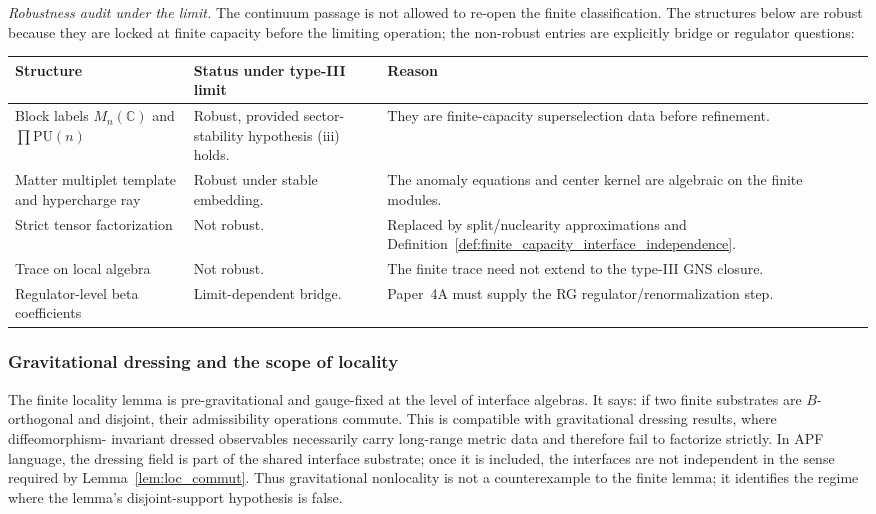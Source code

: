 \documentclass[11pt]{article}
\theoremstyle{definition}
\begin{document}
\noindent\textit{Robustness audit under the limit.}\quad
The continuum passage is not allowed to re-open the finite classification.
The structures below are robust because they are locked at finite capacity
before the limiting operation; the non-robust entries are explicitly bridge
or regulator questions:
\begin{center}
\scriptsize
\renewcommand{\arraystretch}{1.08}
\begin{tabular}{@{}p{3.3cm}p{5.0cm}p{4.0cm}@{}}
\toprule
\textbf{Structure} & \textbf{Status under type-III limit} & \textbf{Reason} \\
\midrule
Block labels $M_n(\mathbb C)$ and $\prod\mathrm{PU}(n)$ & Robust, provided sector-stability hypothesis (iii) holds. & They are finite-capacity superselection data before refinement. \\
Matter multiplet template and hypercharge ray & Robust under stable embedding. & The anomaly equations and center kernel are algebraic on the finite modules. \\
Strict tensor factorization & Not robust. & Replaced by split/nuclearity approximations and Definition~\ref{def:finite_capacity_interface_independence}. \\
Trace on local algebra & Not robust. & The finite trace need not extend to the type-III GNS closure. \\
Regulator-level beta coefficients & Limit-dependent bridge. & Paper~4A must supply the RG regulator/renormalization step. \\
\bottomrule
\end{tabular}
\end{center}
\subsubsection{Gravitational dressing and the scope of locality}
\label{sec:dressing_scope}

The finite locality lemma is pre-gravitational and gauge-fixed at the level
of interface algebras.  It says: if two finite substrates are
$B$-orthogonal and disjoint, their admissibility operations commute.  This is
compatible with gravitational dressing results, where diffeomorphism-
invariant dressed observables necessarily carry long-range metric data and
therefore fail to factorize strictly.  In APF language, the dressing field
is part of the shared interface substrate; once it is included, the
interfaces are not independent in the sense required by
Lemma~\ref{lem:loc_commut}.  Thus gravitational nonlocality is not a
counterexample to the finite lemma; it identifies the regime where the
lemma's disjoint-support hypothesis is false.
\end{document}
